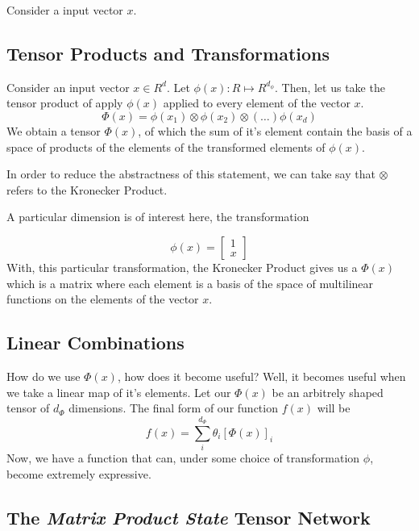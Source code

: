 \documentclass[11pt]{article}
\begin{document}
Consider a input vector $x$.

\subsection{Tensor Products and Transformations}

Consider an input vector $x \in R^d$. Let $\phi(x) : R \mapsto R^{d_{\phi}}$.  
Then, let us take the tensor product of apply $\phi(x)$ applied 
to every element of the vector $x$.
\begin{equation}
    \Phi(x) = \phi(x_1) \otimes  \phi(x_2) 
                \otimes (\dots) \phi(x_d)
\end{equation}
We obtain a tensor $\Phi(x)$, of which the sum of it's element 
contain the basis of a space of products of the elements of the transformed
elements of $\phi(x)$.

In order to reduce the abstractness of this statement, we can take say
that $\otimes$ refers to the Kronecker Product.

A particular dimension is of interest here, the transformation

\begin{equation}
    \phi(x) = 
    \begin{bmatrix}
        1 \\
        x
    \end{bmatrix}
\end{equation}
With, this particular transformation, the Kronecker Product gives us a 
$\Phi(x)$ which is a matrix where each element is a basis of the 
space of multilinear functions on the elements of the vector $x$.

\subsection{Linear Combinations}
How do we use $\Phi(x)$, how does it become useful? Well, it becomes useful 
when we take a linear map of it's elements. Let our $\Phi(x)$ be an 
arbitrely shaped tensor of $d_{\Phi}$ dimensions. The final form of our 
function $f(x)$ will be
\begin{equation}
    f(x) = \sum_{i}^{d_{\Phi}} \theta_i [\Phi(x)]_i
\end{equation}
Now, we have a function that can, under some choice of transformation
$\phi$, become extremely expressive.

\subsection{The \textit{Matrix Product State} Tensor Network}
\end{document}
